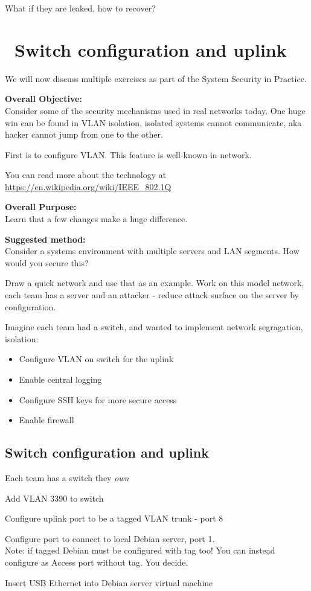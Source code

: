 \documentclass[a4paper,11pt,notitlepage]{report}
\begin{document}
What if they are leaked, how to recover?


\chapter{\faInfoCircle\ Switch configuration and uplink}
\label{ex:switch-config-vlan}

We will now discuss multiple exercises as part of the System Security in Practice.

{\bf Overall Objective:}\\
Consider some of the security mechanisms used in real networks today. One huge win can be found in VLAN isolation, isolated systems cannot communicate, aka hacker cannot jump from one to the other.

First is to configure VLAN. This feature is well-known in network.

You can read more about the technology at\\ \url{https://en.wikipedia.org/wiki/IEEE_802.1Q}

{\bf Overall Purpose:}\\
Learn that a few changes make a huge difference.

{\bf Suggested method:}\\
Consider a systems environment with multiple servers and LAN segments. How would you secure this?

Draw a quick network and use that as an example. Work on this model network, each team has a server and an attacker - reduce attack surface on the server by configuration.

Imagine each team had a switch, and wanted to implement network segragation, isolation:

\begin{itemize}
\item Configure VLAN on switch for the uplink
\item Enable central logging
\item Configure SSH keys for more secure access
\item Enable firewall
\end{itemize}

\section*{Switch configuration and uplink}

Each team has a switch they \emph{own}
\begin{list2}
\item Add VLAN 3390 to switch
\item Configure uplink port to be a tagged VLAN trunk - port 8
\item Configure port to connect to local Debian server, port 1.\\ Note: if tagged Debian must be configured with tag too! You can instead configure as Access port without tag. You decide.
\item Insert USB Ethernet into Debian server virtual machine
\end{list2}
\end{document}
